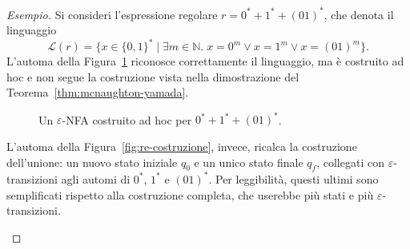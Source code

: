 \documentclass[a4paper, 11pt, oneside]{book}
\theoremstyle{formale}
\newenvironment{esempio}
    {\begin{proof}[\textit{Esempio}]\renewcommand{\qedsymbol}{$\diamond$}}
    {\end{proof}}
\begin{document}
    \begin{esempio}
        Si consideri l'espressione regolare $r = 0^* + 1^* + (01)^*$, che denota il
        linguaggio
        \begin{equation*}
            \mathcal{L}(r) = \{x \in \{0, 1\}^* \mid \exists m \in \mathbb{N}.\;
            x = 0^m \lor x = 1^m \lor x = (01)^m\}.
        \end{equation*}
        L'automa della Figura~\ref{fig:re-adhoc} riconosce correttamente il linguaggio, ma
        \`e costruito ad hoc e non segue la costruzione vista nella dimostrazione del
        Teorema~\ref{thm:mcnaughton-yamada}.

        \begin{figure}[H]
            \centering
            \caption{Un $\varepsilon$-NFA costruito ad hoc per $0^* + 1^* + (01)^*$.}
            \label{fig:re-adhoc}
        \end{figure}

        L'automa della Figura~\ref{fig:re-costruzione}, invece, ricalca la costruzione
        dell'unione: un nuovo stato iniziale $q_0$ e un unico stato finale $q_f$, collegati
        con $\varepsilon$-transizioni agli automi di $0^*$, $1^*$ e $(01)^*$. Per
        leggibilit\`a, questi ultimi sono semplificati rispetto alla costruzione completa,
        che userebbe pi\`u stati e pi\`u $\varepsilon$-transizioni.

        \begin{figure}[H]
            \centering
\end{figure}
\end{esempio}
\end{document}
